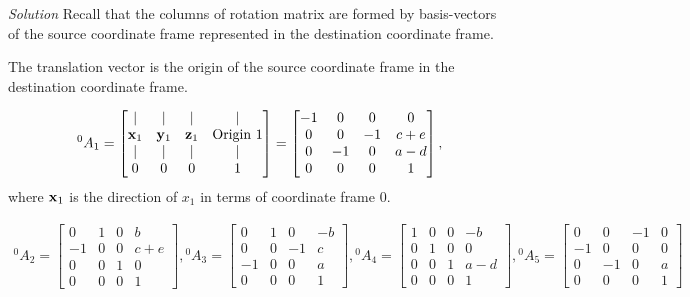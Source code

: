 \documentclass{article}
\numberwithin{prob}{section}
\newenvironment{solution}{\emph{Solution}}{}
\begin{document}
\begin{solution}
Recall that the columns of rotation matrix are formed by basis-vectors of the source coordinate frame represented in the destination coordinate frame.

The translation vector is the origin of the source coordinate frame in the destination coordinate frame.

\begin{align}
  {}^0A_1 = \begin{bmatrix}
    | & | & | & | \\
    \mathbf{x}_1 & \mathbf{y}_1 & \mathbf{z}_1 & \text{Origin 1} \\
    | & | & | & | \\
    0 & 0 & 0 & 1
  \end{bmatrix}
  = \begin{bmatrix}
    -1 & 0 & 0 & 0 \\
    0 & 0 & -1 & c+e\\
    0 & -1 & 0 & a - d\\
    0 & 0 & 0 & 1
  \end{bmatrix}
  ,
\end{align}
where $\mathbf{x}_1$ is the direction of $x_1$ in terms of coordinate frame 0.

\begin{align}
  {}^0A_2 = \begin{bmatrix}
    0  & 1 &  0 & b \\
    -1 & 0 &  0  & c+e\\
    0  & 0 &  1 & 0\\
    0  & 0 &  0 & 1
  \end{bmatrix}
  ,
  {}^0A_3 = \begin{bmatrix}
     0 & 1 &  0 & -b \\
     0 & 0 & -1  & c\\
    -1 & 0 &  0 &  a \\
     0 & 0 &  0 & 1
  \end{bmatrix}
  ,
  {}^0A_4 = \begin{bmatrix}
     1 & 0 &  0 & -b \\
     0 & 1 &  0 & 0 \\
     0 & 0 &  1 & a-d  \\
     0 & 0 &  0 & 1
  \end{bmatrix}
  ,
  {}^0A_5 = \begin{bmatrix}
     0 &  0 & -1 & 0\\
    -1 &  0 &  0 & 0\\
     0 & -1 &  0 & a\\
     0 &  0 &  0 & 1
  \end{bmatrix}
\end{align}


\end{solution}
\end{document}
